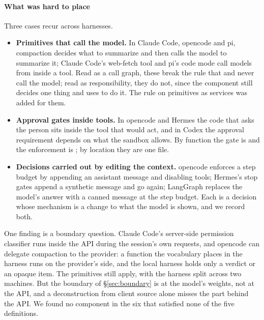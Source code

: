 \paragraph{What was hard to place} Three cases recur across harnesses.
\begin{itemize}
  \item \textbf{Primitives that call the model.} In Claude Code, opencode and pi, compaction decides what to summarize and then calls the model to summarize it; Claude Code's web-fetch tool and pi's code mode call models from inside a tool. Read as a call graph, these break the rule that  and  never call the model; read as responsibility, they do not, since the component still decides one thing and uses  to do it. The rule on primitives as services was added for them.
  \item \textbf{Approval gates inside tools.} In opencode and Hermes the code that asks the person sits inside the tool that would act, and in Codex the approval requirement depends on what the sandbox allows. By function the gate is  and the enforcement is ; by location they are one file.
  \item \textbf{Decisions carried out by editing the context.} opencode enforces a step budget by appending an assistant message and disabling tools; Hermes's stop gates append a synthetic message and go again; LangGraph replaces the model's answer with a canned message at the step budget. Each is a  decision whose mechanism is a change to what the model is shown, and we record both.
\end{itemize}
One finding is a boundary question. Claude Code's server-side permission classifier runs inside the API during the session's own requests, and opencode can delegate compaction to the provider: a function the vocabulary places in the harness runs on the provider's side, and the local harness holds only a verdict or an opaque item. The primitives still apply, with the harness split across two machines. But the boundary of \S\ref{sec:boundary} is at the model's weights, not at the API, and a deconstruction from client source alone misses the part behind the API. We found no component in the six that satisfied none of the five definitions.
